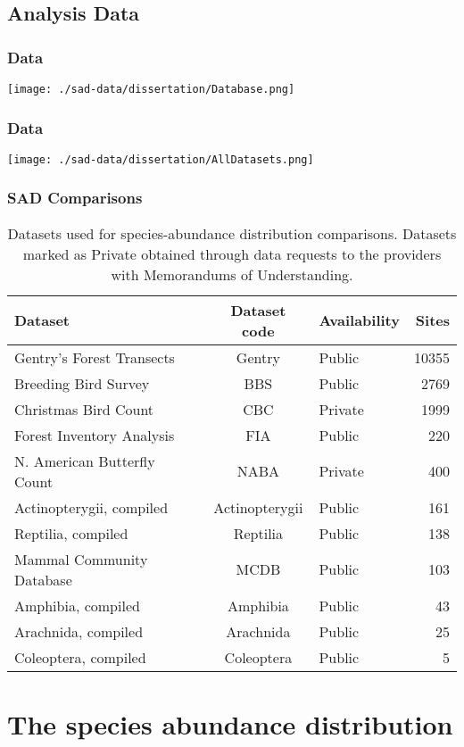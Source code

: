 \documentclass[14pt]{beamer}
\begin{document}
\subsection{Analysis Data}
\begin{frame}{}
\frametitle{Data}
\begin{center}
\texttt{[image: ./sad-data/dissertation/Database.png]}
\end{center}
\end{frame}


\begin{frame}{}
\frametitle{Data}
\texttt{[image: ./sad-data/dissertation/AllDatasets.png]}
\end{frame}

\begin{frame}[shrink=35]
\frametitle{SAD Comparisons}
\begin{center}
\begin{table}
\begin{tabular}{l|c|l|r}
 Dataset &Dataset code &Availability &Sites\\
\hline
 Gentry's Forest Transects &Gentry &Public &10355\\
 Breeding Bird Survey &BBS &Public &2769\\
 Christmas Bird Count &CBC &Private &1999\\
 Forest Inventory Analysis &FIA	 &Public &220\\
 N. American Butterfly Count &NABA &Private &400\\
 Actinopterygii, compiled &Actinopterygii &Public &161\\
 Reptilia, compiled &Reptilia &Public &138\\
 Mammal Community Database &MCDB &Public &103\\
 Amphibia, compiled &Amphibia &Public &43\\
 Arachnida, compiled &Arachnida &Public &25\\
 Coleoptera, compiled &Coleoptera &Public &5\\
\end{tabular}
\caption{Datasets used for species-abundance distribution comparisons. Datasets marked as Private obtained through data requests to the providers with Memorandums of Understanding.}
\end{table}
\end{center}
\end{frame}

\section{The species abundance distribution}
\end{document}
